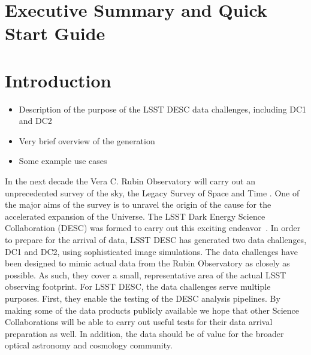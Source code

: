 \documentclass[11pt]{report}
\begin{document}
\setlength\parindent{0em}
\setlength{\parskip}{0.5em}



\renewcommand{\thepage}{\arabic{page}}
\setcounter{page}{1}

\renewcommand\thefigure{\arabic{figure}}
\setcounter{figure}{0}


\section*{Executive Summary and Quick Start Guide}




\section{Introduction}


\begin{itemize}
\item Description of the purpose of the LSST DESC data challenges, including DC1 and DC2
\item Very brief overview of the generation
\item Some example use cases
\end{itemize}

In the next decade the Vera C. Rubin Observatory will carry out an unprecedented survey of the sky, the Legacy Survey of Space and Time \citep{2009arXiv0912.0201L}. One of the major aims of the survey is to unravel the origin of the cause for the accelerated expansion of the Universe. The LSST Dark Energy Science Collaboration (DESC) was formed to carry out this exciting endeavor~\citep{Abate:2012za}. In order to prepare for the arrival of data, LSST DESC has generated two data challenges, DC1 and DC2, using sophisticated image simulations. The data challenges have been designed to mimic actual data from the Rubin Observatory as closely as possible. As such, they cover a small, representative area of the actual LSST observing footprint. For LSST DESC, the data challenges serve multiple purposes. First, they enable the testing of the DESC analysis pipelines.  By making some of the data products publicly available we hope that other Science Collaborations will be able to carry out useful tests for their data arrival preparation as well. In addition, the data should be of value for the broader optical astronomy and cosmology community.
\end{document}
